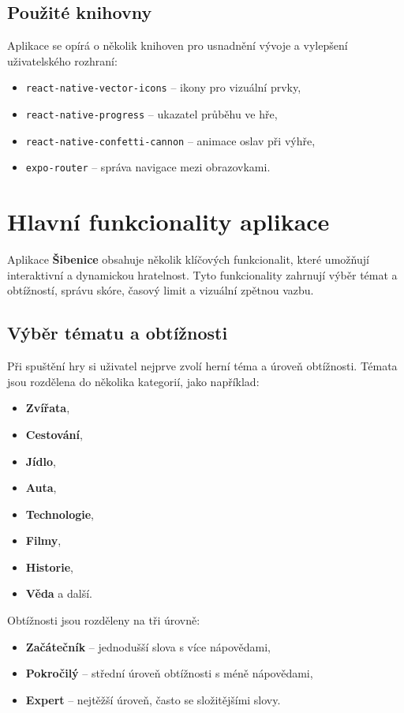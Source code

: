 \documentclass[a4paper,12pt]{article}
\begin{document}
\subsection{Použité knihovny}
Aplikace se opírá o několik knihoven pro usnadnění vývoje a vylepšení uživatelského rozhraní:
\begin{itemize}
    \item \texttt{react-native-vector-icons} – ikony pro vizuální prvky,
    \item \texttt{react-native-progress} – ukazatel průběhu ve hře,
    \item \texttt{react-native-confetti-cannon} – animace oslav při výhře,
    \item \texttt{expo-router} – správa navigace mezi obrazovkami.
\end{itemize}

\section{Hlavní funkcionality aplikace}

Aplikace \textbf{Šibenice} obsahuje několik klíčových funkcionalit, které umožňují interaktivní a dynamickou hratelnost. Tyto funkcionality zahrnují výběr témat a obtížností, správu skóre, časový limit a vizuální zpětnou vazbu.

\subsection{Výběr tématu a obtížnosti}

Při spuštění hry si uživatel nejprve zvolí herní téma a úroveň obtížnosti. Témata jsou rozdělena do několika kategorií, jako například:
\begin{itemize}
    \item \textbf{Zvířata},
    \item \textbf{Cestování},
    \item \textbf{Jídlo},
    \item \textbf{Auta},
    \item \textbf{Technologie},
    \item \textbf{Filmy},
    \item \textbf{Historie},
    \item \textbf{Věda} a další.
\end{itemize}

Obtížnosti jsou rozděleny na tři úrovně:
\begin{itemize}
    \item \textbf{Začátečník} – jednodušší slova s více nápovědami,
    \item \textbf{Pokročilý} – střední úroveň obtížnosti s méně nápovědami,
    \item \textbf{Expert} – nejtěžší úroveň, často se složitějšími slovy.
\end{itemize}
\end{document}
